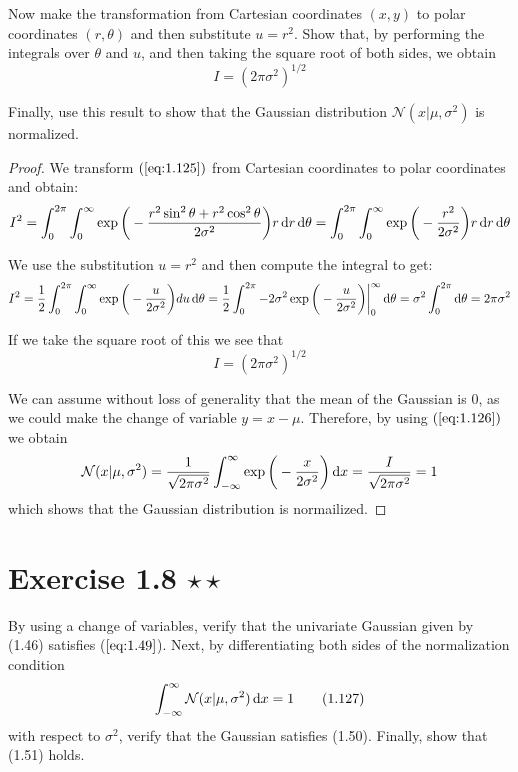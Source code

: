 Now make the transformation from Cartesian coordinates $(x, y)$ to polar coordinates $(r, \theta)$ 
and then substitute $u = r^2$. Show that, by performing the integrals over $\theta$ and $u$,
and then taking the square root of both sides, we obtain
\begin{equation*}
    I = (2\pi\sigma^2)^{1/2}
    \tag{1.126}\label{eq:1.126}
\end{equation*}

Finally, use this result to show that the Gaussian distribution $\mathcal{N}(x | \mu, \sigma^2)$ is 
normalized.

\vspace{1em}

\begin{proof}
    We transform $(\ref{eq:1.125})$ from Cartesian coordinates to polar coordinates and obtain:
\[
    I^2 = \int_{0}^{2\pi} \int_0^\infty \exp 
        \bigg(-\frac{r^2\sin^2 \theta + r^2\cos^2 \theta}{2\sigma^2}\bigg) r\mathop{}\!\mathrm{d} r\mathop{}\!\mathrm{d} \theta
        = \int_{0}^{2\pi} \int_{0}^{\infty} \exp \bigg(-\frac{r^2}{2\sigma^2}\bigg) r\mathop{}\!\mathrm{d} r\mathop{}\!\mathrm{d} \theta
    \] 

    We use the substitution $u = r^2$ and then compute the integral to get:
    \[
        I^2 = \frac{1}{2} \int_{0}^{2\pi} \int_{0}^{\infty} \exp\bigg(-\frac{u}{2\sigma^2}\bigg) du\mathop{}\!\mathrm{d} \theta
        = \frac{1}{2} \int_0^{2\pi} -2\sigma^2 \exp\bigg(-\frac{u}{2\sigma^2}\bigg)\bigg|_0^\infty \mathop{}\!\mathrm{d} \theta
        = \sigma^2 \int_{0}^{2\pi} \mathop{}\!\mathrm{d} \theta = 2\pi\sigma^2
    \] 

    If we take the square root of this we see that
    \begin{equation*}\tag{1.126}
        I = (2\pi\sigma^2)^{1/2}
    \end{equation*}

    We can assume without loss of generality that the mean of the Gaussian is 0,
    as we could make the change of variable $y = x - \mu$. Therefore, by using
    $(\ref{eq:1.126})$ we obtain
    \[
        \mathcal{N}(x | \mu, \sigma^2) 
        = \frac{1}{\sqrt{2\pi\sigma^2}} \int_{-\infty}^{\infty} \exp\bigg(-\frac{x}{2\sigma^2}\bigg) \mathop{}\!\mathrm{d} x
        = \frac{I}{\sqrt{2\pi\sigma^2}} = 1
    \] 
    which shows that the Gaussian distribution is normailized.
\end{proof}

\section*{Exercise 1.8 $\star \star$}
By using a change of variables, verify that the univariate Gaussian
given by (1.46) satisfies ($\ref{eq:1.49}$). Next, by differentiating both sides
of the normalization condition
\begin{equation*}
    \int_{-\infty}^{\infty} \mathcal{N} (x | \mu, \sigma^2) \mathop{}\!\mathrm{d} x = 1
    \tag{1.127}\label{eq:1.127}
\end{equation*}
with respect to $\sigma^2$, verify that the Gaussian satisfies (1.50). Finally,
show that (1.51) holds.

